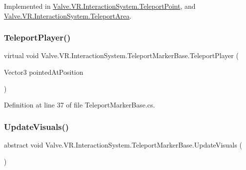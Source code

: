 Implemented in \mbox{\hyperlink{class_valve_1_1_v_r_1_1_interaction_system_1_1_teleport_point_a27ab68b130e5ccc824ed7e93a7b880b8}{Valve.\+V\+R.\+Interaction\+System.\+Teleport\+Point}}, and \mbox{\hyperlink{class_valve_1_1_v_r_1_1_interaction_system_1_1_teleport_area_ad2785af739ebe7063eb636f0c8978a8e}{Valve.\+V\+R.\+Interaction\+System.\+Teleport\+Area}}.

\mbox{\label{class_valve_1_1_v_r_1_1_interaction_system_1_1_teleport_marker_base_a07a9c6f37fddd135dd3ef98c55dc892b}} 
\subsubsection{\texorpdfstring{TeleportPlayer()}{TeleportPlayer()}}
{\footnotesize\ttfamily virtual void Valve.\+V\+R.\+Interaction\+System.\+Teleport\+Marker\+Base.\+Teleport\+Player (\begin{DoxyParamCaption}\item[{Vector3}]{pointed\+At\+Position }\end{DoxyParamCaption})\hspace{0.3cm}{\ttfamily [virtual]}}



Definition at line 37 of file Teleport\+Marker\+Base.\+cs.

\mbox{\label{class_valve_1_1_v_r_1_1_interaction_system_1_1_teleport_marker_base_a5faad5c973035110d88fec8ed93e91ff}} 
\subsubsection{\texorpdfstring{UpdateVisuals()}{UpdateVisuals()}}
{\footnotesize\ttfamily abstract void Valve.\+V\+R.\+Interaction\+System.\+Teleport\+Marker\+Base.\+Update\+Visuals (\begin{DoxyParamCaption}{ }\end{DoxyParamCaption})\hspace{0.3cm}{\ttfamily [pure virtual]}}



